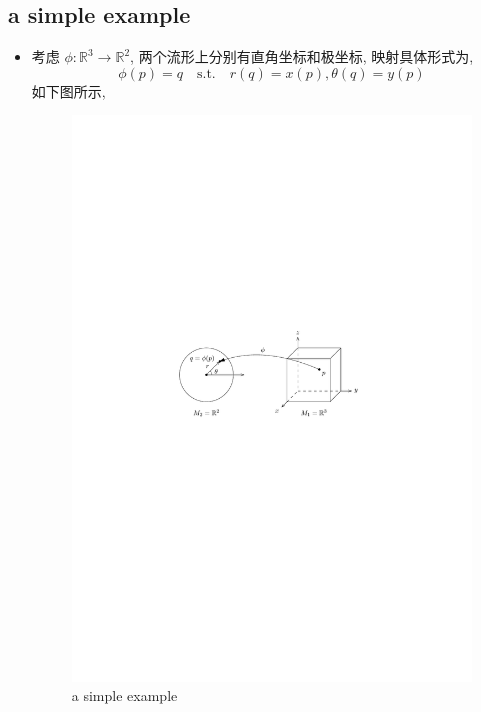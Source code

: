 \documentclass[10pt, a4paper]{article}
\numberwithin{equation}{section}
\begin{document}
	\subsection{a simple example}
	\begin{itemize}
		\item 考虑 $\phi : \mathbb{R}^3 \rightarrow \mathbb{R}^2$, 两个流形上分别有直角坐标和极坐标, 映射具体形式为,
		\begin{equation}
			\phi(p) = q \quad \text{s.t.} \quad r(q) = x(p), \theta(q) = y(p)
		\end{equation}
		如下图所示,
		
		\begin{figure}[H]
			\centering
			\includegraphics[scale=1]{figures/a simple example.pdf}
			\caption{a simple example}
		\end{figure}
		

\end{itemize}
\end{document}
